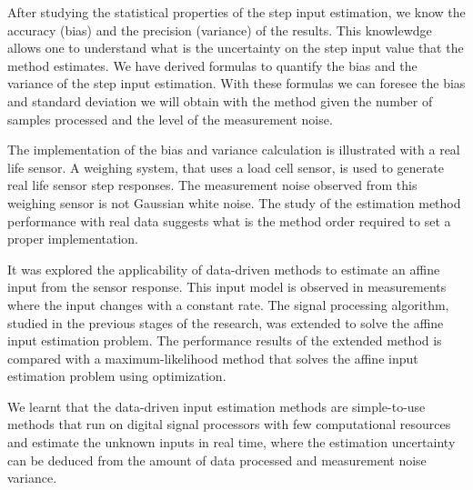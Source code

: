 After studying the statistical properties of the step input estimation, we know the accuracy (bias) and the precision (variance) of the results.
This knowlewdge allows one to understand what is the uncertainty on the step input value that the method estimates.
We have derived formulas to quantify the bias and the variance of the step input estimation.
With these formulas we can foresee the bias and standard deviation we will obtain with the method given the number of samples processed and the level of the measurement noise.

The implementation of the bias and variance calculation is illustrated with a real life sensor.
A weighing system, that uses a load cell sensor, is used to generate real life sensor step responses. 
The measurement noise observed from this weighing sensor is not Gaussian white noise.
The study of the estimation method performance with real data suggests what is the method order required to set a proper implementation. 

It was explored the applicability of data-driven methods to estimate an affine input from the sensor response.
This input model is observed in measurements where the input changes with a constant rate. 
The signal processing algorithm, studied in the previous stages of the research, was extended to solve the affine input estimation problem.   
The performance results of the extended method is compared with a maximum-likelihood method that solves the affine input estimation problem using optimization.

We learnt that the data-driven input estimation methods are simple-to-use methods that run on digital signal processors with few computational resources and estimate the unknown inputs in real time, where the estimation uncertainty can be deduced from the amount of data processed and measurement noise variance.  






\color{black}




